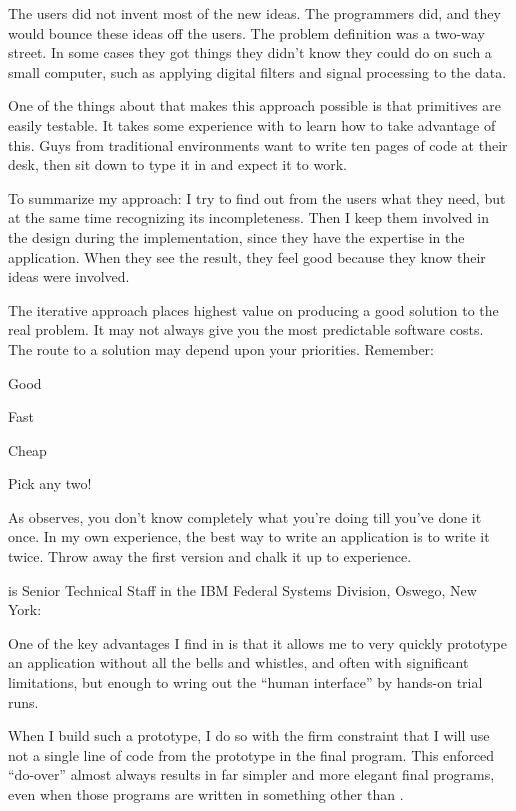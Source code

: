 \begin{interview}
\begin{tfquot}
The users did not invent most of the new ideas. The programmers did,
and they would bounce these ideas off the users. The problem
definition was a two-way street. In some cases they got things they
didn't know they could do on such a small computer, such as applying
digital filters and signal processing to the data.

One of the things about \Forth{} that makes this approach possible is
that primitives are easily testable. It takes some experience with
\Forth{} to learn how to take advantage of this. Guys from traditional
environments want to write ten pages of code at their desk, then sit
down to type it in and expect it to work.

To summarize my approach: I try to find out from the users what they
need, but at the same time recognizing its incompleteness. Then I keep
them involved in the design during the implementation, since they have
the expertise in the application.  When they see the result, they feel
good because they know their ideas were involved.

The iterative approach places highest value on producing a good
solution to the real problem. It may not always give you the most
predictable software costs. The route to a solution may depend upon
your priorities. Remember:
\begin{list}{}{}
\item Good
\item Fast
\item Cheap
\end{list}
Pick any two!
\end{tfquot}
\end{interview}

\noindent As  observes, you don't know completely what you're
doing till you've done it once. In my own experience, the best way to
write an application is to write it twice. Throw away the first
version and chalk it up to experience.%
%
\begin{interview}
\noindent {} is Senior Technical Staff in the IBM Federal
Systems Division, Oswego, New York:

\begin{tfquot}
One of the key advantages I find in \Forth{} is that it allows me to
very quickly prototype an application without all the bells and
whistles, and often with significant limitations, but enough to wring
out the ``human interface'' by hands-on trial runs.

When I build such a prototype, I do so with the firm constraint that I
will use not a single line of code from the prototype in the final
program. This enforced ``do-over'' almost always results in far
simpler and more elegant final programs, even when those programs are
written in something other than \Forth{}.
\end{tfquot}
\end{interview}%

